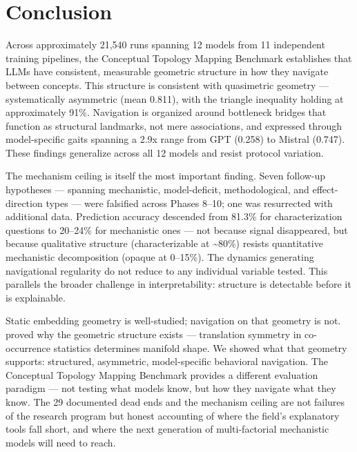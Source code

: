 \section{Conclusion}\label{conclusion}

Across approximately 21,540 runs spanning 12 models from 11 independent training pipelines, the Conceptual Topology Mapping Benchmark establishes that LLMs have consistent, measurable geometric structure in how they navigate between concepts. This structure is consistent with quasimetric geometry --- systematically asymmetric (mean 0.811), with the triangle inequality holding at approximately 91\%. Navigation is organized around bottleneck bridges that function as structural landmarks, not mere associations, and expressed through model-specific gaits spanning a 2.9x range from GPT (0.258) to Mistral (0.747). These findings generalize across all 12 models and resist protocol variation.

The mechanism ceiling is itself the most important finding. Seven follow-up hypotheses --- spanning mechanistic, model-deficit, methodological, and effect-direction types --- were falsified across Phases 8--10; one was resurrected with additional data. Prediction accuracy descended from 81.3\% for characterization questions to 20--24\% for mechanistic ones --- not because signal disappeared, but because qualitative structure (characterizable at \textasciitilde80\%) resists quantitative mechanistic decomposition (opaque at 0--15\%). The dynamics generating navigational regularity do not reduce to any individual variable tested. This parallels the broader challenge in interpretability: structure is detectable before it is explainable.

Static embedding geometry is well-studied; navigation on that geometry is not. \citet{karkada2025translation} proved why the geometric structure exists --- translation symmetry in co-occurrence statistics determines manifold shape. We showed what that geometry supports: structured, asymmetric, model-specific behavioral navigation. The Conceptual Topology Mapping Benchmark provides a different evaluation paradigm --- not testing what models know, but how they navigate what they know. The 29 documented dead ends and the mechanism ceiling are not failures of the research program but honest accounting of where the field's explanatory tools fall short, and where the next generation of multi-factorial mechanistic models will need to reach.
